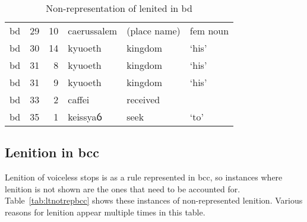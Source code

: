 \begin{table}[h]
  \centering
  \begin{tabular}{addwql}
    \toprule
     &  &  &  &  &  \\
    \midrule
    bd & 29 & 10 & caerussalem & (place name) & fem noun \\
    bd & 30 & 14 & kyuoeth & kingdom &  ‘his' \\
    bd & 31 & 8 & kyuoeth & kingdom &  ‘his' \\
    bd & 31 & 9 & kyuoeth & kingdom &  ‘his' \\
    bd & 33 & 2 & caffei & received &  \\
    bd & 35 & 1 & keissyaỽ & seek &  ‘to' \\
    \bottomrule
  \end{tabular}%
  \caption{Non-representation of lenited  in \acrshort{bd}}
  \label{tab:nonlencbd}
\end{table}

\subsection{Lenition in \acrshort{bcc}}
\label{sec:lenition-acrshortbcc}


Lenition of voiceless stops is as a rule represented in \gls{bcc}, so instances where lenition is not shown are the ones that need to be accounted for.
Table~\ref{tab:ltnotrepbcc} shows these instances of non-represented lenition.
Various reasons for lenition appear multiple times in this table.



